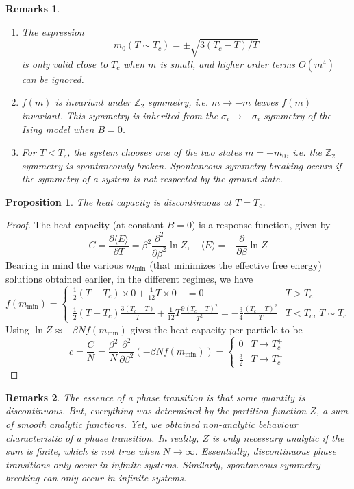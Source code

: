 \documentclass[a4paper]{article}
\newtheorem{remarks}{Remarks}[section]
\theoremstyle{new}
\newtheorem{prop}{Proposition}[section]
\begin{document}
\newpage
\begin{remarks}\leavevmode
\begin{enumerate}
    \item The expression 
$$m_0(T\sim T_c)=\pm\sqrt{3(T_c-T)/T}$$
is only valid close to $T_c$ when $m$ is small, and higher order terms $O(m^4)$ can be ignored.
    \item $f(m)$ is invariant under $\mathbb{Z}_2$ symmetry, i.e. $m\rightarrow -m$ leaves $f(m)$ invariant. This symmetry is inherited from the $\sigma_i\rightarrow-\sigma_i$ symmetry of the Ising model when $B=0$.
    \item For $T<T_c$, the system chooses one of the two states $m=\pm m_0$, i.e. the $\mathbb{Z}_2$ symmetry is spontaneously broken. Spontaneous symmetry breaking occurs if the symmetry of a system is not respected by the ground state.
\end{enumerate}
\end{remarks}
\begin{prop}
The heat capacity is discontinuous at $T=T_c$.
\end{prop}
\begin{proof}
The heat capacity (at constant $B=0$) is a response function, given by
$$C=\frac{\partial\langle E\rangle}{\partial T}=\beta^2\frac{\partial^2}{\partial\beta^2}\ln Z,\quad\langle E\rangle=-\frac{\partial}{\partial\beta}\ln Z$$
Bearing in mind the various $m_{\text{min}}$ (that minimizes the effective free energy) solutions obtained earlier, in the different regimes, we have 
$$f(m_{\text{min}})=
\left\{
        \begin{array}{ll}
      \frac{1}{2}(T-T_c)\times 0+\frac{1}{12}T\times 0\quad=0 & T>T_c \\
      \frac{1}{2}(T-T_c)\frac{3(T_c-T)}{T}+\frac{1}{12}T\frac{9(T_c-T)^2}{T^2}=-\frac{3}{4}\frac{(T_c-T)^2}{T} & T<T_c,~T\sim T_c
      \end{array}
    \right.$$
Using $\ln Z\approx-\beta N f(m_{\text{min}})$ gives the heat capacity per particle to be
$$c=\frac{C}{N}=\frac{\beta^2}{N}\frac{\partial^2}{\partial\beta^2}(-\beta N f(m_{\text{min}}))=
\left\{
        \begin{array}{ll}
      0 & T\rightarrow T_c^+ \\
      \frac{3}{2} & T\rightarrow T_c^-
        \end{array}
    \right.$$
\end{proof}
\begin{remarks}
The essence of a phase transition is that some quantity is discontinuous. But, everything was determined by the partition function $Z$, a sum of smooth analytic functions. Yet, we obtained non-analytic behaviour characteristic of a phase transition. In reality, $Z$ is only necessary analytic if the sum is finite, which is not true when $N\rightarrow\infty$. Essentially, discontinuous phase transitions only occur in infinite systems.  Similarly, spontaneous symmetry breaking can only occur in infinite systems.
\end{remarks}
\end{document}
